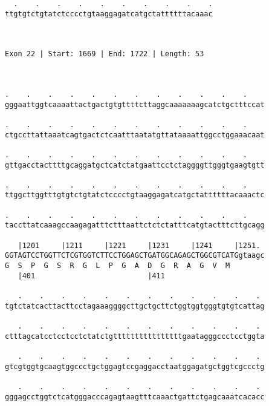 \documentclass{article}
\begin{document}
\begin{Verbatim}
  .    .    .    .    .    .    .    .    .    .
ttgtgtctgtatctcccctgtaaggagatcatgctattttttacaaac
                                                
                                                
 
Exon 22 | Start: 1669 | End: 1722 | Length: 53



.    .    .    .    .    .    .    .    .    .    .    .    
gggaattggtcaaaattactgactgtgttttcttaggcaaaaaaagcatctgctttccat
                                                            
.    .    .    .    .    .    .    .    .    .    .    .    
ctgccttattaaatcagtgactctcaatttaatatgttataaaattggcctggaaacaat
                                                            
.    .    .    .    .    .    .    .    .    .    .    .    
gttgacctacttttgcaggatgctcatctatgaattcctctaggggttgggtgaagtgtt
                                                            
.    .    .    .    .    .    .    .    .    .    .    .    
ttggcttggtttgtgtctgtatctcccctgtaaggagatcatgctattttttacaaactc
                                                            
.    .    .    .    .    .    .    .    .    .    .    .    
taccttatcaaagccaagagatttctttaattctctctatttcatgtactttcttgcagg
                                                            
   |1201     |1211     |1221     |1231     |1241     |1251. 
GGTAGTCCTGGTTCTCGTGGTCTTCCTGGAGCTGATGGCAGAGCTGGCGTCATGgtaagc
G  S  P  G  S  R  G  L  P  G  A  D  G  R  A  G  V  M        
   |401                          |411                       
  
   .    .    .    .    .    .    .    .    .    .    .    . 
tgtctatcacttacttcctagaaaggggcttgctgcttctggtggtgggtgtgtcattag
                                                            
   .    .    .    .    .    .    .    .    .    .    .    . 
ctttagcatcctcctcctctatctgttttttttttttttttgaatagggccctcctggta
                                                            
   .    .    .    .    .    .    .    .    .    .    .    . 
gtcgtggtgcaagtggccctgctggagtccgaggacctaatggagatgctggtcgccctg
                                                            
   .    .    .    .    .    .    .    .    .    .    .    . 
gggagcctggtctcatgggacccagagtaagtttcaaactgattctgagcaaatcacacc
                                                            

\end{Verbatim}
\end{document}
